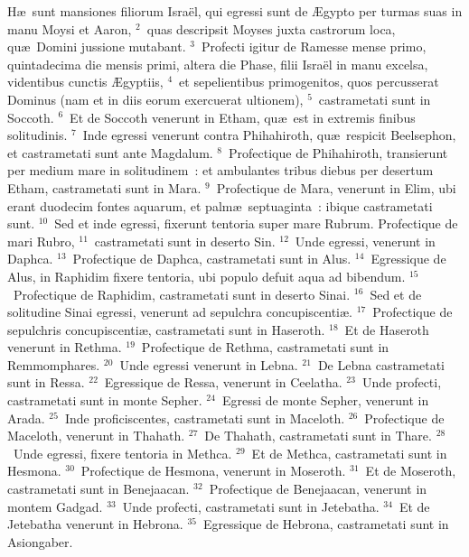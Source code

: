 \lettrine[lines=3,image=true,loversize=0.05,lraise=-0.03]{H}{}\ae\ sunt mansiones filiorum Isra\"el, qui egressi sunt de \AE gypto per turmas suas in manu Moysi et Aaron,
${}^{2}$~quas descripsit Moyses juxta castrorum loca, qu\ae\ Domini jussione mutabant.
${}^{3}$~Profecti igitur de Ramesse mense primo, quintadecima die mensis primi, altera die Phase, filii Isra\"el in manu excelsa, videntibus cunctis \AE gyptiis,
${}^{4}$~et sepelientibus primogenitos, quos percusserat Dominus (nam et in diis eorum exercuerat ultionem),
${}^{5}$~castrametati sunt in Soccoth.
${}^{6}$~Et de Soccoth venerunt in Etham, qu\ae\ est in extremis finibus solitudinis.
${}^{7}$~Inde egressi venerunt contra Phihahiroth, qu\ae\ respicit Beelsephon, et castrametati sunt ante Magdalum.
${}^{8}$~Profectique de Phihahiroth, transierunt per medium mare in solitudinem~: et ambulantes tribus diebus per desertum Etham, castrametati sunt in Mara.
${}^{9}$~Profectique de Mara, venerunt in Elim, ubi erant duodecim fontes aquarum, et palm\ae\ septuaginta~: ibique castrametati sunt.
${}^{10}$~Sed et inde egressi, fixerunt tentoria super mare Rubrum. Profectique de mari Rubro,
${}^{11}$~castrametati sunt in deserto Sin.
${}^{12}$~Unde egressi, venerunt in Daphca.
${}^{13}$~Profectique de Daphca, castrametati sunt in Alus.
${}^{14}$~Egressique de Alus, in Raphidim fixere tentoria, ubi populo defuit aqua ad bibendum.
${}^{15}$~Profectique de Raphidim, castrametati sunt in deserto Sinai.
${}^{16}$~Sed et de solitudine Sinai egressi, venerunt ad sepulchra concupiscenti\ae .
${}^{17}$~Profectique de sepulchris concupiscenti\ae , castrametati sunt in Haseroth.
${}^{18}$~Et de Haseroth venerunt in Rethma.
${}^{19}$~Profectique de Rethma, castrametati sunt in Remmomphares.
${}^{20}$~Unde egressi venerunt in Lebna.
${}^{21}$~De Lebna castrametati sunt in Ressa.
${}^{22}$~Egressique de Ressa, venerunt in Ceelatha.
${}^{23}$~Unde profecti, castrametati sunt in monte Sepher.
${}^{24}$~Egressi de monte Sepher, venerunt in Arada.
${}^{25}$~Inde proficiscentes, castrametati sunt in Maceloth.
${}^{26}$~Profectique de Maceloth, venerunt in Thahath.
${}^{27}$~De Thahath, castrametati sunt in Thare.
${}^{28}$~Unde egressi, fixere tentoria in Methca.
${}^{29}$~Et de Methca, castrametati sunt in Hesmona.
${}^{30}$~Profectique de Hesmona, venerunt in Moseroth.
${}^{31}$~Et de Moseroth, castrametati sunt in Benejaacan.
${}^{32}$~Profectique de Benejaacan, venerunt in montem Gadgad.
${}^{33}$~Unde profecti, castrametati sunt in Jetebatha.
${}^{34}$~Et de Jetebatha venerunt in Hebrona.
${}^{35}$~Egressique de Hebrona, castrametati sunt in Asiongaber.
